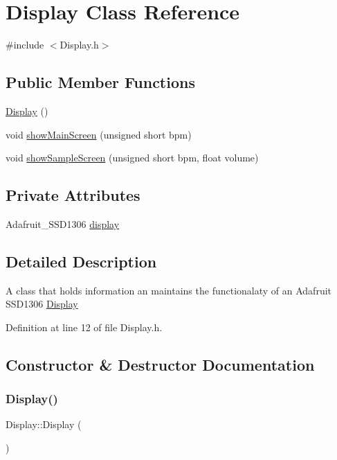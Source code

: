 \hypertarget{class_display}{}\section{Display Class Reference}
\label{class_display}


{\ttfamily \#include $<$Display.\+h$>$}

\subsection*{Public Member Functions}
\begin{DoxyCompactItemize}
\item 
\hyperlink{class_display_ae972fffea6f7ca1d627ef48c3d841bb3}{Display} ()
\item 
void \hyperlink{class_display_aae248dcbc4c44b911c35918feacaf31a}{show\+Main\+Screen} (unsigned short bpm)
\item 
void \hyperlink{class_display_ae00838dd994556524fb8d86d7e855770}{show\+Sample\+Screen} (unsigned short bpm, float volume)
\end{DoxyCompactItemize}
\subsection*{Private Attributes}
\begin{DoxyCompactItemize}
\item 
Adafruit\+\_\+\+S\+S\+D1306 \hyperlink{class_display_ad8b8ca65d118eb16461932c6630463a1}{display}
\end{DoxyCompactItemize}


\subsection{Detailed Description}
A class that holds information an maintains the functionalaty of an Adafruit S\+S\+D1306 \hyperlink{class_display}{Display} 

Definition at line 12 of file Display.\+h.



\subsection{Constructor \& Destructor Documentation}
\mbox{\label{class_display_ae972fffea6f7ca1d627ef48c3d841bb3}} 
\subsubsection{\texorpdfstring{Display()}{Display()}}
{\footnotesize\ttfamily Display\+::\+Display (\begin{DoxyParamCaption}{ }\end{DoxyParamCaption})}

